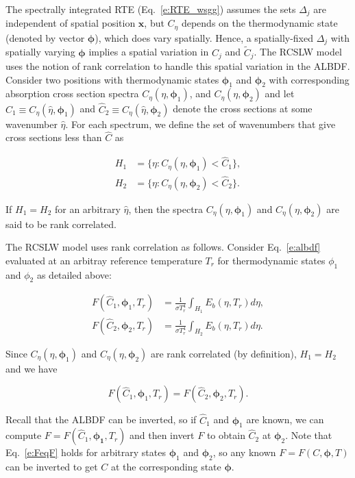 \documentclass[preprint,12pt]{elsarticle}
\newcommand{\BS}{\boldsymbol}
\begin{document}
The spectrally integrated RTE (Eq.~\ref{e:RTE_wsgg}) assumes the sets $\Delta_j$ are independent of spatial position $\mathbf{x}$, but $C_\eta$ depends on the thermodynamic state (denoted by vector $\BS{\phi}$), which does vary spatially.
Hence, a spatially-fixed $\Delta_j$ with spatially varying $\BS{\phi}$ implies a spatial variation in $C_j$ and $\tilde{C}_j$. 
The RCSLW model uses the notion of rank correlation to handle  this spatial variation in the ALBDF. 
Consider two positions with thermodynamic states $\BS{\phi}_1$ and $\BS{\phi}_2$ with corresponding absorption cross section spectra $C_\eta(\eta,\BS{\phi}_1)$, and $C_\eta(\eta,\BS{\phi}_2)$ and let $\hat{C}_1\equiv C_\eta(\hat{\eta},\BS{\phi}_1)$ and $\hat{C}_2\equiv C_\eta(\hat{\eta},\BS{\phi}_2)$ denote the cross sections at some wavenumber $\hat{\eta}$. For each spectrum, we define the set of wavenumbers that give cross sections less than $\hat{C}$ as
%
\begin{linenomath}
\begin{align}
    H_1&=\{\eta: C_\eta(\eta,\BS{\phi}_1)<\hat{C}_1\}, \\
    H_2&=\{\eta: C_\eta(\eta,\BS{\phi}_2)<\hat{C}_2\}.
    \end{align}
\end{linenomath}
%
If $H_1=H_2$ for an arbitrary $\hat{\eta}$, then the spectra $C_\eta(\eta,\BS{\phi}_1)$ and $C_\eta(\eta,\BS{\phi}_2)$ are said to be rank correlated.

The RCSLW model uses rank correlation as follows.
Consider Eq.~\ref{e:albdf} evaluated at an arbitray reference temperature $T_r$ for thermodynamic states $\phi_1$ and $\phi_2$ as detailed above:
%
\begin{linenomath}
    \begin{align} \label{e:albdf2}
        F(\hat{C}_1,\BS{\phi}_1,T_r) &= \frac{1}{\sigma T_r^4}\int_{H_1}E_b(\eta,T_r)d\eta, \\
        F(\hat{C}_2,\BS{\phi}_2,T_r) &= \frac{1}{\sigma T_r^4}\int_{H_2}E_b(\eta,T_r)d\eta.
    \end{align}
\end{linenomath}
%
Since $C_\eta(\eta,\BS{\phi}_1)$ and $C_\eta(\eta,\BS{\phi}_2)$ are rank correlated (by definition), $H_1=H_2$ and we have 
%
\begin{linenomath}
    \begin{equation}\label{e:FeqF}
    F(\hat{C}_1,\BS{\phi}_1,T_r)=F(\hat{C}_2,\BS{\phi}_2,T_r).
\end{equation}
\end{linenomath}
%
Recall that the ALBDF can be inverted, so if $\hat{C}_1$ and $\BS{\phi}_1$ are known, we can compute $F=F(\hat{C}_1,\BS{\phi_1},T_r)$ and then invert $F$ to obtain $\hat{C}_2$ at $\BS{\phi}_2$. Note that Eq.~\ref{e:FeqF} holds for arbitrary states $\BS{\phi}_1$ and $\BS{\phi}_2$, so any known $F=F(C,\BS{\phi},T)$ can be inverted to get $C$ at the corresponding state $\BS{\phi}$. 
\end{document}
